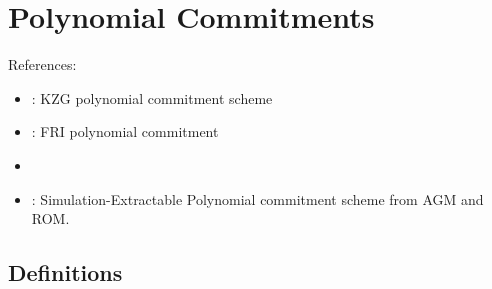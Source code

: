 \section{Polynomial Commitments}

References:
\begin{itemize}
    \item \cite{AC:KatZavGol10}: KZG polynomial commitment scheme
    \item \cite{ICALP:BBHR18}: FRI polynomial commitment
    \item \cite{JC:FenMogNgu24}
    \item \cite{PKC:Libert24b}: Simulation-Extractable Polynomial commitment scheme from AGM and ROM.
\end{itemize}

\subsection{Definitions}

